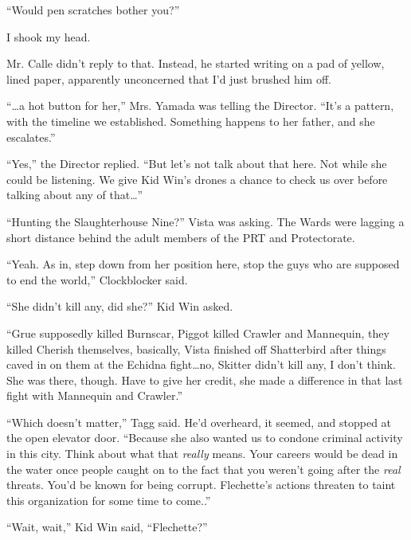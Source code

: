 ``Would pen scratches bother you?''



I shook my head.



Mr. Calle didn't reply to that.  Instead, he started writing on a pad of yellow, lined paper, apparently unconcerned that I'd just brushed him off.



``\ldots{}a hot button for her,'' Mrs. Yamada was telling the Director.  ``It's a pattern, with the timeline we established.  Something happens to her father, and she escalates.''



``Yes,'' the Director replied.  ``But let's not talk about that here.  Not while she could be listening.  We give Kid Win's drones a chance to check us over before talking about any of that\ldots''



``Hunting the Slaughterhouse Nine?'' Vista was asking.  The Wards were lagging a short distance behind the adult members of the PRT and Protectorate.



``Yeah.  As in, step down from her position here, stop the guys who are supposed to end the world,'' Clockblocker said.



``She didn't kill any, did she?'' Kid Win asked.



``Grue supposedly killed Burnscar, Piggot killed Crawler and Mannequin, they killed Cherish themselves, basically, Vista finished off Shatterbird after things caved in on them at the Echidna fight\ldots no, Skitter didn't kill any, I don't think.  She was there, though.  Have to give her credit, she made a difference in that last fight with Mannequin and Crawler.''



``Which doesn't matter,'' Tagg said.  He'd overheard, it seemed, and stopped at the open elevator door.  ``Because she also wanted us to condone criminal activity in this city.  Think about what that \emph{really} means.  Your careers would be dead in the water once people caught on to the fact that you weren't going after the \emph{real }threats.  You'd be known for being corrupt.  Flechette's actions threaten to taint this organization for some time to come..''



``Wait, wait,'' Kid Win said, ``Flechette?''



